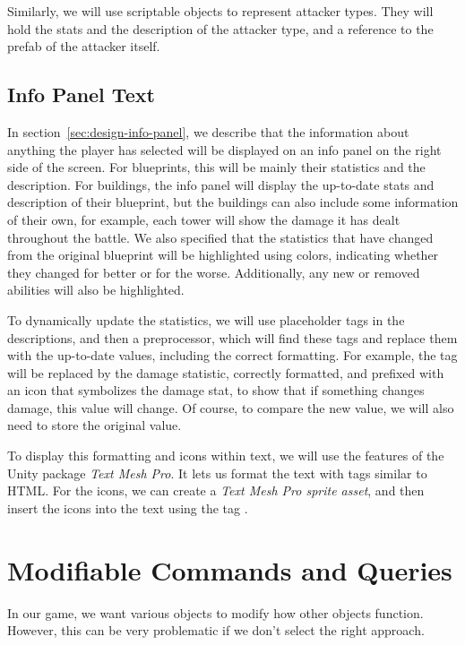 Similarly, we will use scriptable objects to represent attacker types.
They will hold the stats and the description of the attacker type, and a reference to the prefab of the attacker itself.

\subsection{Info Panel Text}\label{sec:analysis-description-tags}
In section~\ref{sec:design-info-panel}, we describe that the information about anything the player has selected will be displayed on an info panel on the right side of the screen.
For blueprints, this will be mainly their statistics and the description.
For buildings, the info panel will display the up-to-date stats and description of their blueprint, but the buildings can also include some information of their own, for example, each tower will show the damage it has dealt throughout the battle.
We also specified that the statistics that have changed from the original blueprint will be highlighted using colors, indicating whether they changed for better or for the worse.
Additionally, any new or removed abilities will also be highlighted.

To dynamically update the statistics, we will use placeholder tags in the descriptions, and then a preprocessor, which will find these tags and replace them with the up-to-date values, including the correct formatting.
For example, the tag \mono{[DMG]} will be replaced by the damage statistic, correctly formatted, and prefixed with an icon that symbolizes the damage stat, to show that if something changes damage, this value will change.
Of course, to compare the new value, we will also need to store the original value.

To display this formatting and icons within text, we will use the features of the Unity package \emph{Text Mesh Pro}.
It lets us format the text with tags similar to HTML.
For the icons, we can create a \emph{Text Mesh Pro sprite asset}, and then insert the icons into the text using the tag .

\section{Modifiable Commands and Queries}\label{sec:analysis-modifiable-commands}

In our game, we want various objects to modify how other objects function.
However, this can be very problematic if we don't select the right approach.

